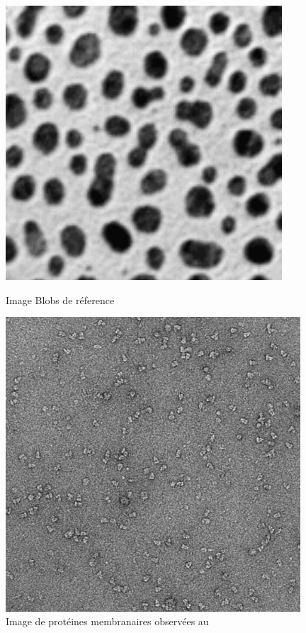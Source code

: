 \begin{figure}[!ht]
\begin{center}
 \begin{minipage}{.450\linewidth}
  \includegraphics[width=0.92\textwidth]{blobs.png}  
  \caption{Image Blobs de réference}
  \label{blobs1}
 \end{minipage} \hfill
\begin{minipage}{.450\linewidth}
  \includegraphics[width=0.98\textwidth]{proteines.jpg}   
  \caption{Image de protéines membranaires observées au \me}
  \label{prot}
 \end{minipage} \hfill
\end{center}
\end{figure}

